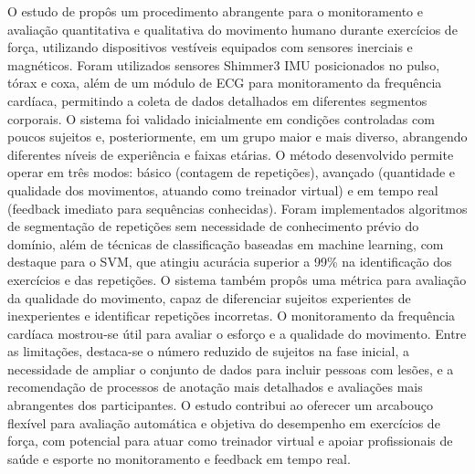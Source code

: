 O estudo de  propôs um procedimento abrangente para o monitoramento e avaliação quantitativa e qualitativa do movimento humano durante exercícios de força, utilizando dispositivos vestíveis equipados com sensores inerciais e magnéticos. Foram utilizados sensores Shimmer3 IMU posicionados no pulso, tórax e coxa, além de um módulo de ECG para monitoramento da frequência cardíaca, permitindo a coleta de dados detalhados em diferentes segmentos corporais. O sistema foi validado inicialmente em condições controladas com poucos sujeitos e, posteriormente, em um grupo maior e mais diverso, abrangendo diferentes níveis de experiência e faixas etárias. O método desenvolvido permite operar em três modos: básico (contagem de repetições), avançado (quantidade e qualidade dos movimentos, atuando como treinador virtual) e em tempo real (feedback imediato para sequências conhecidas). Foram implementados algoritmos de segmentação de repetições sem necessidade de conhecimento prévio do domínio, além de técnicas de classificação baseadas em machine learning, com destaque para o SVM, que atingiu acurácia superior a 99\% na identificação dos exercícios e das repetições. O sistema também propôs uma métrica para avaliação da qualidade do movimento, capaz de diferenciar sujeitos experientes de inexperientes e identificar repetições incorretas. O monitoramento da frequência cardíaca mostrou-se útil para avaliar o esforço e a qualidade do movimento. Entre as limitações, destaca-se o número reduzido de sujeitos na fase inicial, a necessidade de ampliar o conjunto de dados para incluir pessoas com lesões, e a recomendação de processos de anotação mais detalhados e avaliações mais abrangentes dos participantes. O estudo contribui ao oferecer um arcabouço flexível para avaliação automática e objetiva do desempenho em exercícios de força, com potencial para atuar como treinador virtual e apoiar profissionais de saúde e esporte no monitoramento e feedback em tempo real.

